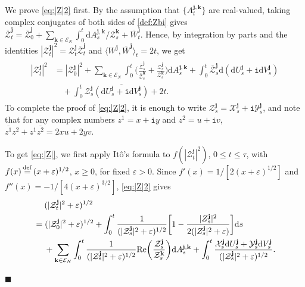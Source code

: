 \documentclass[12pt, twoside]{article}
\numberwithin{figure}{section}
\renewcommand{\Re}{{\rm Re}}
\newcommand{\1}{\mathds 1}
\newcommand{\vep}{{\varepsilon}}
\newcommand{\la}{{\langle}}
\newcommand{\mc}{\mathcal}
\renewcommand{\d}{{\mathrm d}}
\newcommand{\2}{{\mathbf 1}}
\renewcommand{\i}{{\mathtt i}}
\newcommand{\defeq}{{\stackrel{\rm def}{=}}}
\renewenvironment{proof}[1][\proofname]{\noindent {\bfseries #1.}\;}{\hfill\ensuremath{\blacksquare}\\}
\newcommand{\bj}{\mathbf j}
\newcommand{\bk}{\mathbf k}
\begin{document}
\begin{proof}
We prove \eqref{eq:|Z|2} first.
By the assumption that $\{A^{\bj,\bk}_t\}$ are real-valued, taking complex conjugates of both sides of \eqref{def:Zbi} gives
$\overline{\mathcal Z}^\bj_t=\overline{\mathcal Z}^\bj_0+\sum_{\bk\in \mathcal E_N}\int_0^t\d A^{\bj,\bk}_s/\mathcal Z^\bk_s+\overline{W}_t^\bj$.
Hence, by integration by parts and the identities $|\mathcal Z^\bj_t|^2=\mathcal Z_t^\bj\overline{\mathcal Z}^\bj_t$ and $\la  W^\bj,\overline{W}^\bj\rangle_t=2t$, we get
\begin{align}\label{eq:Zsqrt1}
\begin{split}
|\mathcal Z^\bj_t|^2&=|\mathcal Z^\bj_0|^2+\sum_{\bk\in \mathcal E_N}\int_0^t\biggl(\frac{\overline{\mathcal Z}^\bj_s}{\overline{\mathcal Z}^\bk_s}+\frac{\mathcal Z^\bj_s}{\mathcal Z^\bk_s}\biggr)\d A^{\bj,\bk}_s+\int_0^t \overline{\mathcal Z}^\bj_s\d (\d U^\bj_s+\i\d V^\bj_s )\\
&\quad +\int_0^t 
\mathcal Z_s^\bj\overline{(\d U^\bj_s+\i\d V^\bj_s )}+2t.
\end{split}
\end{align}
To complete the proof of \eqref{eq:|Z|2}, it is enough to write $\mathcal Z^\bj_s=\mc X^\bj_s+\i\mc Y^\bj_s$, and note that for any complex numbers $z^1=x+\i y$ and $z^2=u+\i v$, 
$\overline{z^1}z^2+z^1\overline{z^2}=2xu+2yv$.

To get \eqref{eq:|Z|}, we first apply It\^{o}'s formula to $f(|\mathcal Z^\bj_t|^2)$, $0\leq t\leq \tau$, with $f(x)\,\defeq\,(x+\vep)^{1/2}$, $x\geq 0$, for fixed $\vep>0$. Since $f'(x)=1/[2(x+\vep)^{1/2}]$ and $f''(x)=-1/[4(x+\vep)^{3/2}]$, \eqref{eq:|Z|2} gives
\begin{align}
\begin{split}\label{|Z|:lim0}
&\quad\;(|\mathcal Z^\bj_t|^2+\vep)^{1/2}\\
&=(|\mathcal Z^\bj_0|^2+\vep)^{1/2}+\int_0^t\frac{1}{(|\mathcal Z^\bj_s|^2+\vep)^{1/2}}\biggl[1-\frac{|Z^\bj_s|^2}{2(|Z_s^\bj|^2+\vep)}\biggr]\d s\\
&\quad\;+\sum_{\bk\in \mathcal E_N}\int_0^t\frac{1}{(|\mathcal Z^\bj_s|^2+\vep)^{1/2}}\Re\biggl(\frac{\mathcal Z^\bj_s}{\mathcal Z^\bk_s}\biggr)\d A^{\bj,\bk}_s +\int_0^t \frac{\mathcal X^\bj_s\d U^\bj_s+\mathcal Y^\bj_s\d V^\bj_s}{(|\mathcal Z^\bj_s|^2+\vep)^{1/2}}.
\end{split}
\end{align}


\end{proof}
\end{document}

